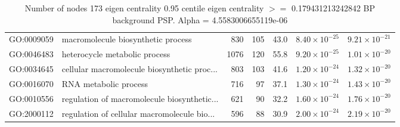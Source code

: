 \begin{table}[ht]
\begin{adjustbox}{max width=\textwidth}
\begin{tabular}{llrrrrr}
  GO:0009059 & macromolecule biosynthetic process & 830 & 105 & 43.0 & $8.40 \times 10^{-25}$ & $9.21 \times 10^{-21}$ \\ 
  GO:0046483 & heterocycle metabolic process & 1076 & 120 & 55.8 & $9.20 \times 10^{-25}$ & $1.01 \times 10^{-20}$ \\ 
  GO:0034645 & cellular macromolecule biosynthetic proc... & 803 & 103 & 41.6 & $1.20 \times 10^{-24}$ & $1.32 \times 10^{-20}$ \\ 
  GO:0016070 & RNA metabolic process & 716 & 97 & 37.1 & $1.30 \times 10^{-24}$ & $1.43 \times 10^{-20}$ \\ 
  GO:0010556 & regulation of macromolecule biosynthetic... & 621 & 90 & 32.2 & $1.60 \times 10^{-24}$ & $1.76 \times 10^{-20}$ \\ 
  GO:2000112 & regulation of cellular macromolecule bio... & 596 & 88 & 30.9 & $2.00 \times 10^{-24}$ & $2.19 \times 10^{-20}$ \\ 
   \hline
\end{tabular}
\end{adjustbox}
\caption{Number of nodes 173 eigen centrality 0.95 centile  eigen centrality $>=$ 0.179431213242842 BP background PSP. Alpha = 4.5583006655119e-06} 
\label{tab:Number of nodes 173 eigen centrality 0.95 centile  eigen centrality $>=$ 0.179431213242842 BP background PSP. Alpha = 4.5583006655119e-06}
\end{table}

